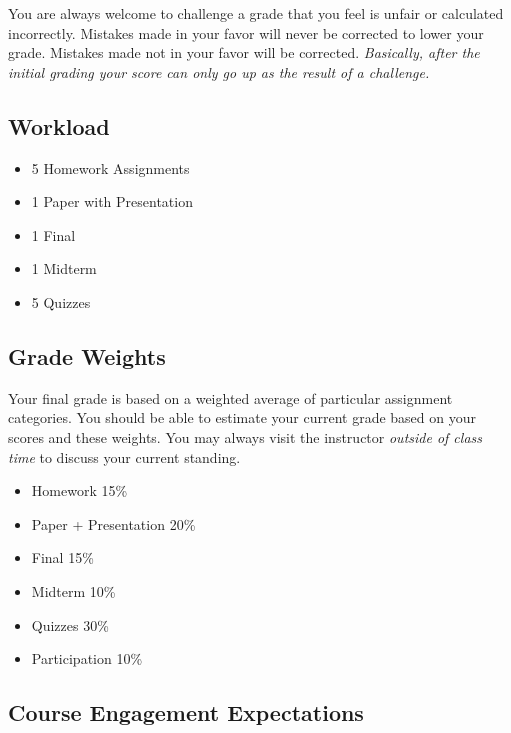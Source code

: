 \documentclass[10pt]{article}
\begin{document}
You are always welcome to challenge a grade that you feel is unfair or calculated incorrectly.  Mistakes made in your favor will never be corrected to lower your grade.  Mistakes made not in your favor will be corrected.  \textit{Basically, after the initial grading your score can only go up as the result of a challenge.}

\subsection{Workload}

\begin{itemize}
\item 5 Homework Assignments
\item 1 Paper with Presentation
\item 1 Final
\item 1 Midterm
\item 5 Quizzes
\end{itemize}

\subsection{Grade Weights}

Your final grade is based on a weighted average of particular assignment categories.  You should be able to estimate your current grade based on your scores and these weights.  You may always visit the instructor \textit{outside of class time} to discuss your current standing.  
\begin{itemize}
\item Homework 15\%
\item Paper + Presentation 20\%
\item Final 15\%
\item Midterm 10\%
\item Quizzes 30\%
\item Participation 10\%
\end{itemize} 

\subsection{Course Engagement Expectations}
\end{document}
